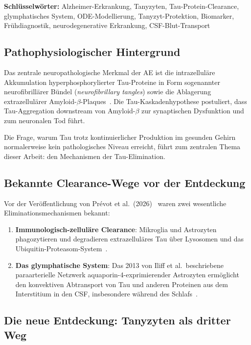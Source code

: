 ﻿\documentclass[12pt,a4paper]{article}
\theoremstyle{definition}
\begin{document}
	\textbf{Schlüsselwörter:} Alzheimer-Erkrankung, Tanyzyten, Tau-Protein-Clearance, glymphatisches System, ODE-Modellierung, Tanyzyt-Protektion, Biomarker, Frühdiagnostik, neurodegenerative Erkrankung, CSF-Blut-Transport
	
	\subsection{Pathophysiologischer Hintergrund}
	
	Das zentrale neuropathologische Merkmal der AE ist die intrazelluläre Akkumulation hyperphosphorylierter Tau-Proteine in Form sogenannter neurofibrillärer Bündel (\emph{neurofibrillary tangles}) sowie die Ablagerung extrazellulärer Amyloid-$\beta$-Plaques~\cite{Braak2006}. Die Tau-Kaskadenhypothese postuliert, dass Tau-Aggregation downstream von Amyloid-$\beta$ zur synaptischen Dysfunktion und zum neuronalen Tod führt.
	
	Die Frage, warum Tau trotz kontinuierlicher Produktion im gesunden Gehirn normalerweise kein pathologisches Niveau erreicht, führt zum zentralen Thema dieser Arbeit: den Mechanismen der Tau-Elimination.
	
	\subsection{Bekannte Clearance-Wege vor der Entdeckung}
	
	Vor der Veröffentlichung von Prévot et al.\ (2026)~\cite{Prevot2026} waren zwei wesentliche Eliminationsmechanismen bekannt:
	
	\begin{enumerate}[label=(\roman*)]
		\item \textbf{Immunologisch-zelluläre Clearance}: Mikroglia und Astrozyten phagozytieren und degradieren extrazelluläres Tau über Lysosomen und das Ubiquitin-Proteasom-System~\cite{Heneka2015}.
		\item \textbf{Das glymphatische System}: Das 2013 von Iliff et al.\ beschriebene paraarterielle Netzwerk aquaporin-4-exprimierender Astrozyten ermöglicht den konvektiven Abtransport von Tau und anderen Proteinen aus dem Interstitium in den CSF, insbesondere während des Schlafs~\cite{Iliff2013}.
	\end{enumerate}
	
	\subsection{Die neue Entdeckung: Tanyzyten als dritter Weg}
	
\end{document}

